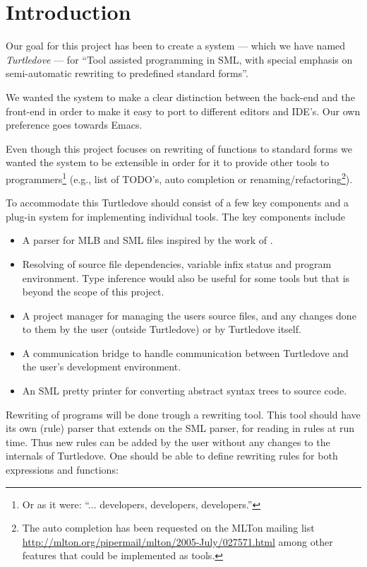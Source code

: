 \chapter{Introduction}\label{chap:introduction}
Our goal for this project has been to create a system --- which we have named
\textit{Turtledove} --- for ``Tool assisted programming in SML, with special
emphasis on semi-automatic rewriting to predefined standard forms''.

We wanted the system to make a clear distinction between the back-end and the
front-end in order to make it easy to port to different editors and IDE's. Our
own preference goes towards Emacs.

Even though this project focuses on rewriting of functions to standard forms we
wanted the system to be extensible in order for it to provide other tools to
programmers\footnote{Or as it were: ``... developers, developers, developers.''}
(e.g., list of TODO's, auto completion or renaming/refactoring\footnote{The auto
  completion has been requested on the MLTon mailing list
  \url{http://mlton.org/pipermail/mlton/2005-July/027571.html} among other
  features that could be implemented as tools.}).

To accommodate this Turtledove should consist of a few key components and a
plug-in system for implementing individual tools. The key components include
\begin{itemize}
\item A parser for MLB and SML files inspired by the work of \cite{mbp08}.
\item Resolving of source file dependencies, variable infix status and program
  environment. Type inference would also be useful for some tools but that is
  beyond the scope of this project.
\item A project manager for managing the users source files, and any changes
  done to them by the user (outside Turtledove) or by Turtledove itself.
\item A communication bridge to handle communication between Turtledove and the
  user's development environment.
\item An SML pretty printer for converting abstract syntax trees to source code.
\end{itemize}

Rewriting of programs will be done trough a rewriting tool. This tool should
have its own (rule) parser that extends on the SML parser, for reading in rules
at run time. Thus new rules can be added by the user without any changes to the
internals of Turtledove. One should be able to define rewriting rules for both
expressions and functions:

